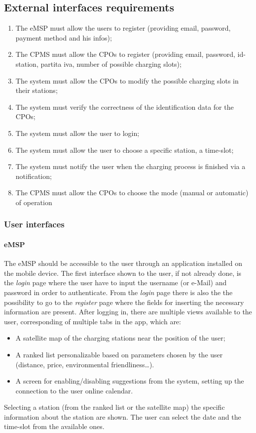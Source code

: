 \subsection{External interfaces requirements}
\begin{enumerate}[label=\textbf{R\arabic*}]
    \item The \ac{eMSP} must allow the users to register (providing email, password, payment method and his infos);
    \item The \ac{CPMS} must allow the \acp{CPO} to register (providing email, password, id-station, partita iva, number of possible charging slots);
    \item The system must allow the \acp{CPO} to modify the possible charging slots in their stations;
    \item The system must verify the correctness of the identification data for the \acp{CPO};
    \item The system must allow the user to login;
    \item The system must allow the user to choose a specific station, a time-slot;
    \item The system must notify the user when the charging process is finished via a notification;
    \item The \ac{CPMS} must allow the \acp{CPO} to choose the mode (manual or automatic) of operation
\end{enumerate}

\subsubsection{User interfaces}
\paragraph{\ac{eMSP}}
The \ac{eMSP} should be accessible to the user through an application installed on the mobile device.
The first interface shown to the user, if not already done, is the \textit{login} page where the user have to input the username (or e-Mail) and password in order to authenticate.
From the \textit{login} page there is also the the possibility to go to the \textit{register} page where the fields for inserting the necessary information are present.
After logging in, there are multiple views available to the user, corresponding of multiple tabs in the app, which are:
\begin{itemize}
    \item A satellite map of the charging stations near the position of the user;
    \item A ranked list personalizable based on parameters chosen by the user (distance, price, environmental friendliness\ldots).
    \item A screen for enabling/disabling suggestions from the system, setting up the connection to the user online calendar.
\end{itemize}
Selecting a station (from the ranked list or the satellite map) the specific information about the station are shown. The user can select the date and the time-slot from the available ones.


